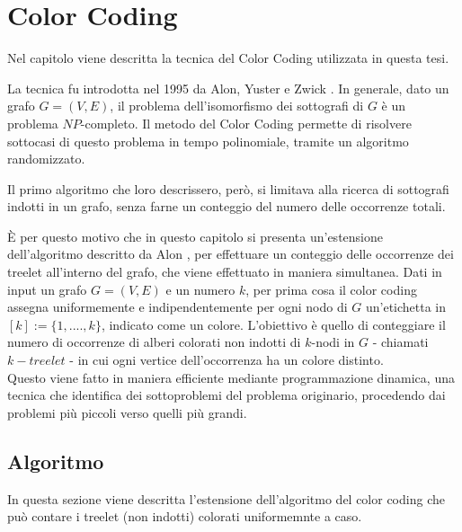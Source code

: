 \chapter{Color Coding}
\label{cap 2}
Nel capitolo viene descritta la tecnica del Color Coding utilizzata in questa tesi.

La tecnica fu introdotta nel 1995 da Alon, Yuster e Zwick \cite{alon1995color}.
In generale, dato un grafo $G = (V,E)$, il problema dell'isomorfismo dei sottografi  di $G$ \`e un problema $NP$-completo.
Il metodo del Color Coding permette di risolvere sottocasi di questo problema in tempo polinomiale, tramite un algoritmo randomizzato.

Il primo algoritmo che loro descrissero, per\`o, si limitava alla ricerca di sottografi indotti in un grafo, senza farne un conteggio del numero delle occorrenze totali.
 
\`E per questo motivo che in questo capitolo si presenta un'estensione dell'algoritmo descritto da Alon \cite{alon1995color,bressan2018motif}, per effettuare un conteggio delle occorrenze dei treelet all'interno del grafo, che viene effettuato in maniera simultanea.
Dati in input un grafo $ G=(V,E) $ e un numero $ k $, per prima cosa il color coding assegna uniformemente e indipendentemente per ogni nodo di $ G $ un'etichetta in $ [k] := \{1,....,k\} $, indicato come un colore.
L'obiettivo \`e quello di conteggiare il numero di occorrenze di alberi colorati non indotti di $ k$-nodi in $ G $ - chiamati $ k-treelet $ - in cui ogni vertice dell'occorrenza ha un colore distinto.\\
Questo viene fatto in maniera efficiente mediante  programmazione dinamica, una tecnica che identifica dei sottoproblemi del problema originario, procedendo dai problemi pi\`u piccoli verso quelli pi\`u grandi.




\section{Algoritmo}
\label{section1}

In questa sezione viene descritta l'estensione dell'algoritmo del color coding che pu\`o contare i treelet (non indotti) colorati uniformemnte a caso.

